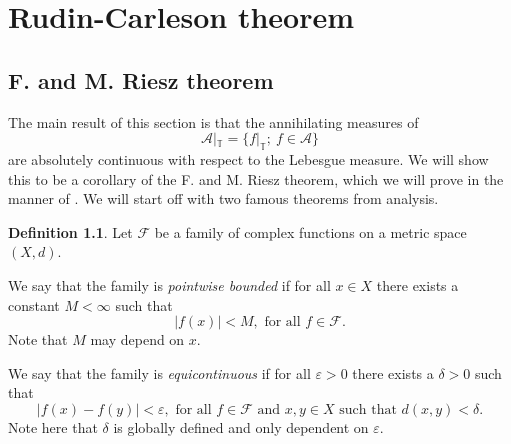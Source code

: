 \documentclass[a4paper,12pt,twoside,BCOR=10mm]{scrbook}
\theoremstyle{definition}
\theoremstyle{definition}
\theoremstyle{definition}
\newtheorem{definition}[theorem]{Definition}
\begin{document}
\chapter{Rudin-Carleson theorem}
\section{F. and M. Riesz theorem}
\label{section1}
The main result of this section is that the annihilating measures of 
\[
	\mathcal{A}|_{\mathbb{T}} = \{f|_{\mathbb{T}};\ f \in \mathcal{A}\}
\]
are absolutely continuous with respect to the Lebesgue measure.
We will show this to be a corollary of the F. and M. Riesz theorem, which we will prove in the manner of \citep{rudin2}.
We will start off with two famous theorems from analysis. 
\begin{definition}
Let $\mathcal{F}$ be a family of complex functions on a metric space $(X, d)$.

We say that the family is \emph{pointwise bounded} if for all $x \in X$ there exists a constant $M < \infty$ such that
\[
	|f(x)| < M,\text{ for all } f \in \mathcal{F}.
\]
Note that $M$ may depend on $x$.

We say that the family is \emph{equicontinuous} if for all $\varepsilon > 0$ there exists a $\delta > 0$ such that
\[
	|f(x) - f(y)| < \varepsilon,\text{ for all } f \in \mathcal{F}\text{ and } x, y \in X\text{ such that } d(x, y) < \delta.
\]
Note here that $\delta$ is globally defined and only dependent on $\varepsilon$.
\end{definition}
\end{document}
